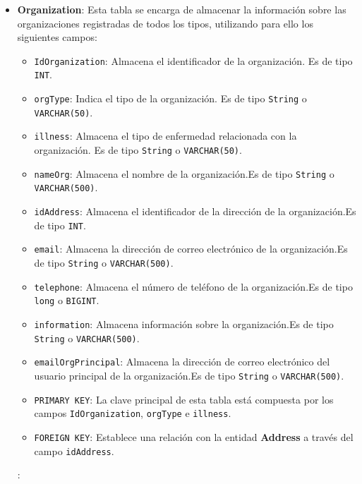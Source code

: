 \begin{itemize}
    \item \textbf{Organization}: Esta tabla se encarga de almacenar la información sobre las organizaciones registradas de todos los tipos, utilizando para ello los siguientes campos:
        \begin{itemize}
        \item \texttt{IdOrganization}: Almacena el identificador de la organización. Es de tipo \texttt{INT}.
        \item \texttt{orgType}: Indica el tipo de la organización. Es de tipo \texttt{String} o \texttt{VARCHAR(50)}.
        \item \texttt{illness}: Almacena el tipo de enfermedad relacionada con la organización. Es de tipo \texttt{String} o \texttt{VARCHAR(50)}.
        \item \texttt{nameOrg}: Almacena el nombre de la organización.Es de tipo \texttt{String} o \texttt{VARCHAR(500)}.
        \item \texttt{idAddress}: Almacena el identificador de la dirección de la organización.Es de tipo \texttt{INT}.
        \item \texttt{email}: Almacena la dirección de correo electrónico de la organización.Es de tipo \texttt{String} o \texttt{VARCHAR(500)}.
        \item \texttt{telephone}: Almacena el número de teléfono de la organización.Es de tipo \texttt{long} o \texttt{BIGINT}.
        \item \texttt{information}: Almacena información sobre la organización.Es de tipo \texttt{String} o \texttt{VARCHAR(500)}.
        \item \texttt{emailOrgPrincipal}: Almacena la dirección de correo electrónico del usuario principal de la organización.Es de tipo \texttt{String} o \texttt{VARCHAR(500)}.
        \item \texttt{PRIMARY KEY}: La clave principal de esta tabla está compuesta por los campos \texttt{IdOrganization}, \texttt{orgType} e \texttt{illness}.
        \item \texttt{FOREIGN KEY}: Establece una relación con la entidad \textbf{Address} a través del campo \texttt{idAddress}.
        \end{itemize}
        :


\end{itemize}
